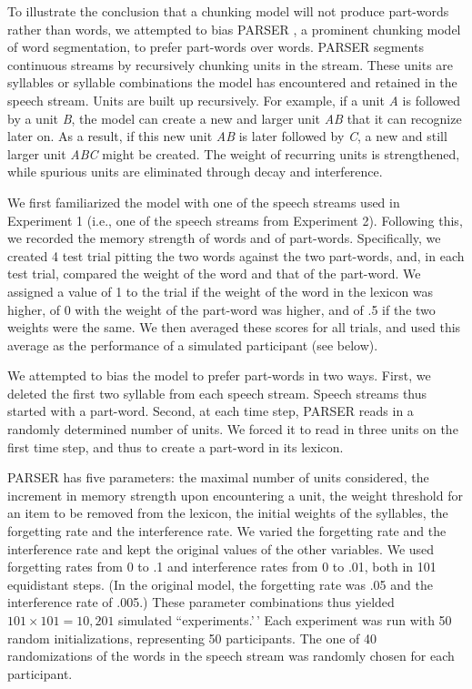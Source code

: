 \documentclass[
]{article}
\begin{document}
To illustrate the conclusion that a chunking model will not produce
part-words rather than words, we attempted to bias PARSER
\citep{Perruchet1998}, a prominent chunking model of word segmentation,
to prefer part-words over words. PARSER segments continuous streams by
recursively chunking units in the stream. These units are syllables or
syllable combinations the model has encountered and retained in the
speech stream. Units are built up recursively. For example, if a unit
\emph{A} is followed by a unit \emph{B}, the model can create a new and
larger unit \emph{AB} that it can recognize later on. As a result, if
this new unit \emph{AB} is later followed by \emph{C}, a new and still
larger unit \emph{ABC} might be created. The weight of recurring units
is strengthened, while spurious units are eliminated through decay and
interference.

We first familiarized the model with one of the speech streams used in
Experiment 1 (i.e., one of the speech streams from
\citep{Saffran-Science} Experiment 2). Following this, we recorded the
memory strength of words and of part-words. Specifically, we created 4
test trial pitting the two words against the two part-words, and, in
each test trial, compared the weight of the word and that of the
part-word. We assigned a value of 1 to the trial if the weight of the
word in the lexicon was higher, of 0 with the weight of the part-word
was higher, and of .5 if the two weights were the same. We then averaged
these scores for all trials, and used this average as the performance of
a simulated participant (see below).

We attempted to bias the model to prefer part-words in two ways. First,
we deleted the first two syllable from each speech stream. Speech
streams thus started with a part-word. Second, at each time step, PARSER
reads in a randomly determined number of units. We forced it to read in
three units on the first time step, and thus to create a part-word in
its lexicon.

PARSER has five parameters: the maximal number of units considered, the
increment in memory strength upon encountering a unit, the weight
threshold for an item to be removed from the lexicon, the initial
weights of the syllables, the forgetting rate and the interference rate.
We varied the forgetting rate and the interference rate and kept the
original values of the other variables. We used forgetting rates from 0
to .1 and interference rates from 0 to .01, both in 101 equidistant
steps. (In the original model, the forgetting rate was .05 and the
interference rate of .005.) These parameter combinations thus yielded
\(101 \times 101 = 10,201\) simulated ``experiments.'\,' Each experiment
was run with 50 random initializations, representing 50 participants.
The one of 40 randomizations of the words in the speech stream was
randomly chosen for each participant.
\end{document}
